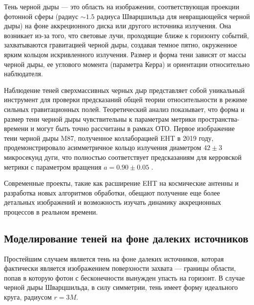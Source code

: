 Тень черной дыры — это область на изображении, соответствующая проекции фотонной сферы (радиус \(\sim 1.5\) радиуса Шварцшильда для невращающейся черной дыры) на фоне аккреционного диска или другого источника излучения. Она возникает из-за того, что световые лучи, проходящие ближе к горизонту событий, захватываются гравитацией черной дыры, создавая темное пятно, окруженное ярким кольцом искривленного излучения. Размер и форма тени зависят от массы черной дыры, ее углового момента (параметра Керра) и ориентации относительно наблюдателя.

Наблюдение теней сверхмассивных черных дыр представляет собой уникальный инструмент для проверки предсказаний общей теории относительности в режиме сильных гравитационных полей. Теоретический анализ показывает, что форма и размер тени черной дыры  чувствительны к параметрам метрики пространства-времени и могут быть точно рассчитаны в рамках ОТО. Первое изображение тени черной дыры M87, полученное коллаборацией EHT в 2019 году, продемонстрировало асимметричное кольцо излучения диаметром \(42\pm3\) микросекунд дуги, что полностью соответствует предсказаниям для керровской метрики с параметром вращения \(a = 0.90\pm0.05\) \cite{EHTM872019}. 


Современные проекты, такие как расширение EHT на космические антенны и разработка новых алгоритмов обработки, обещают получение еще более детальных изображений и возможность изучать динамику аккреционных процессов в реальном времени.

\subsection{Моделирование теней на фоне далеких источников}\label{sub:1.3.2}

Простейшим случаем является тень на фоне далеких источников, которая фактически является изображением поверхности захвата — границы области, попав в которую фотон с бесконечности вынужден упасть на горизонт. В случае черной дыры Шварцшильда, в силу симметрии, тень имеет форму идеального круга, радиусом \(r=3M\). 

